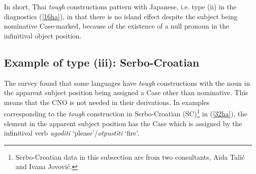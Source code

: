 \documentclass[output=paper,colorlinks,citecolor=brown,
]{langscibook}
\begin{document}
\begin{exe}
\ex \label{31ha}
\begin{xlist}

\end{xlist}
\end{exe}

In short, Thai \textit{tough} constructions pattern with Japanese, i.e. type (ii) in the diagnostics (\ref{16ha}), in that there is no island effect despite the subject being nominative Case-marked, because of the existence of a null pronoun in the infinitival object position.  

\subsection{Example of type (iii): Serbo-Croatian} \label{s3.4ha}
The survey found that some languages have \textit{tough} constructions with the noun in the apparent subject position being assigned a Case other than nominative. This means that the CNO is not needed in their derivations. In examples corresponding to the \textit{tough} construction in Serbo-Croatian (SC)\footnote{Serbo-Croatian data in this subsection are from two consultants, Aida Talić and Ivana Jovović.}  in (\ref{32ha}), the element in the apparent subject position has the Case which is assigned by the infinitival verb \textit{ugoditi} ‘please’/\textit{otpustiti} ‘fire’. 
\end{document}
